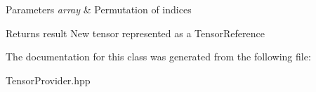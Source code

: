 \begin{DoxyParams}{Parameters}
{\em array} & Permutation of indices \\
\hline
\end{DoxyParams}
\begin{DoxyReturn}{Returns}
result New tensor represented as a Tensor\+Reference 
\end{DoxyReturn}


The documentation for this class was generated from the following file\+:\begin{DoxyCompactItemize}
\item 
Tensor\+Provider.\+hpp\end{DoxyCompactItemize}
